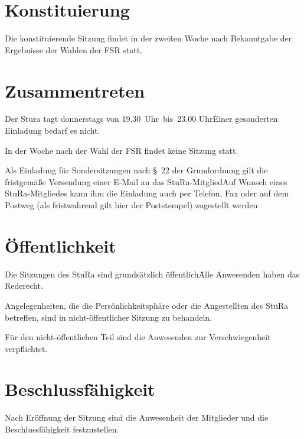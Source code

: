 \setcounter{section}{0} %

\begin{multicols}{2}

\section{Konstituierung}

\Abs \Satz Die konstituierende Sitzung findet in der zweiten Woche nach Bekanntgabe der Ergebnisse der Wahlen der FSR statt.



\section{Zusammentreten}

\Abs \Satz Der Stura tagt donnerstags von 19.30~Uhr~bis~23.00 Uhr\. Einer gesonderten Einladung bedarf es nicht.

\Abs \Satz In der Woche nach der Wahl der FSR findet keine Sitzung statt.

\Abs \Satz Als Einladung für Sondersitzungen nach §~22 der Grundordnung gilt die fristgemäße Versendung einer E-Mail an das StuRa-Mitglied\. Auf Wunsch eines StuRa-Mitgliedes kann ihm die Einladung auch per Telefon, Fax oder auf dem Postweg (als fristwahrend gilt hier der Poststempel) zugestellt werden.



\section{Öffentlichkeit}

\Abs \Satz Die Sitzungen des StuRa sind grundsätzlich öffentlich\. Alle Anwesenden haben das Rederecht.

\Abs \Satz Angelegenheiten, die die Persönlichkeitsphäre oder die Angestellten des StuRa betreffen, sind in nicht-öffentlicher Sitzung zu behandeln.

\Abs \Satz Für den nicht-öffentlichen Teil sind die Anwesenden zur Verschwiegenheit verpflichtet.



\section{Beschlussfähigkeit}

\Abs \Satz Nach Eröffnung der Sitzung sind die Anwesenheit der Mitglieder und die Beschlussfähigkeit festzustellen.




\end{multicols}
